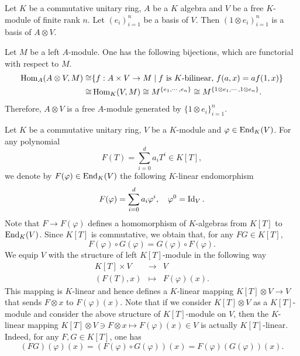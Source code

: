 \begin{propositionenv}\label{prop:6.2.2}
    Let $K$ be a commutative unitary ring,
    $A$ be a $K$ algebra and $V$ be a free $K$-module of finite rank $n$.
    Let $(e_i)_{i=1}^{n}$ be a basis of $V$.
    Then $(1 \otimes e_i)_{i=1}^{n}$ is a basis of $A \otimes V$.
\end{propositionenv}
\begin{proofenv}
    Let $M$ be a left $A$-module.
    One has the following bijections, which are functorial with respect to $M$.
    $$\begin{aligned}
        \operatorname{\mathrm{Hom}}_A (A \otimes V, M) \cong & \{f : A \times V \rightarrow M \mid f \text{ is $K$-bilinear, } f (a,x) = a f(1,x)\}\\
        \cong & \operatorname{\mathrm{Hom}}_K (V,M) \cong M^{\{e_1,\cdots,e_n\}} \cong M^{\{1 \otimes e_1,\cdots,1 \otimes e_n\}}.
    \end{aligned}$$
    Therefore, $A \otimes V$ is a free $A$-module generated by $\{1 \otimes e_i\}_{i=1}^{n}$.
\end{proofenv}

\begin{definitionenv}\label{def:6.2.3}
    Let $K$ be a commutative unitary ring,
    $V$ be a $K$-module and $\varphi \in \operatorname{\mathrm{End}}_{K}(V)$.
    For any polynomial
    $$F(T) = \sum_{i=0}^{d} a_i T^i \in K[T],$$
    we denote by $F(\varphi) \in \operatorname{\mathrm{End}}_{K}(V)$ the following $K$-linear endomorphism
    $$F(\varphi) = \sum_{i=0}^{d} a_i \varphi^i,\quad \varphi^0 = \operatorname{\mathrm{Id}}_V.$$
    Note that $F \rightarrow F(\varphi)$ defines a homomorphism of $K$-algebras from $K[T]$ to $\operatorname{\mathrm{End}}_{K}(V)$.
    Since $K[T]$ is commutative, we obtain that, for any $FG \in K[T]$, 
    $$F(\varphi) \circ G(\varphi) = G(\varphi) \circ F(\varphi).$$
    We equip $V$ with the structure of left $K[T]$-module in the following way
    $$\begin{array}{rcl}
        K[T] \times V & \longrightarrow & V\\
        (F(T),x) & \longmapsto & F(\varphi)(x).
    \end{array}$$
    This mapping is $K$-linear and hence defines a $K$-linear mapping $K[T] \otimes V \rightarrow V$ that sends $F \otimes x$ to $F(\varphi)(x)$.
    Note that if we consider $K[T] \otimes V$ as a $K[T]$-module and consider the above structure of $K[T]$-module on $V$,
    then the $K$-linear mapping $K[T]\otimes V \ni F \otimes x \mapsto F(\varphi)(x) \in V$ is actually $K[T]$-linear.
    Indeed, for any $F,G \in K[T]$, one has
    $$(FG)(\varphi)(x) = (F(\varphi) \circ G(\varphi))(x) = F(\varphi) (G(\varphi))(x).$$
\end{definitionenv}

